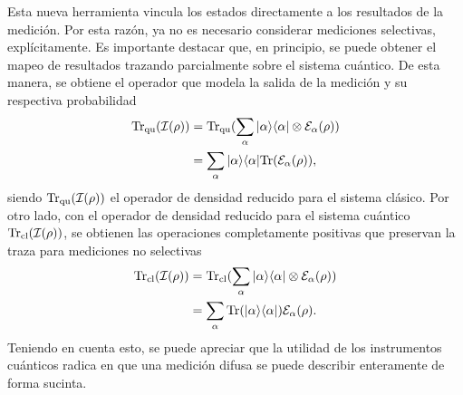 

Esta nueva herramienta vincula los estados directamente a los resultados de la
medición. Por esta razón, ya no es necesario considerar mediciones selectivas,
explícitamente.  Es importante destacar que, en principio, se puede obtener el
mapeo de resultados trazando parcialmente sobre el sistema cuántico. De
esta manera, se obtiene el operador que modela la salida de la medición y su
respectiva probabilidad 
\begin{equation}
    \begin{split}
    {\rm Tr}_{\text{qu}}(\mathcal{I}(\rho))&={\rm Tr}_{\text{qu}}(\sum_\alpha |\alpha\rangle \langle\alpha|\otimes \mathcal{E}_\alpha(\rho))\\
    &=\sum_\alpha |\alpha\rangle \langle\alpha|{\rm Tr}(\mathcal{E}_\alpha(\rho)),
\end{split}
\end{equation}siendo ${\rm Tr}_{\text{qu}}(\mathcal{I}(\rho))$ el operador de densidad reducido para el sistema clásico. 
Por otro lado, con el operador de densidad reducido para el sistema cuántico
${\rm Tr}_{\text{cl}}(\mathcal{I}(\rho))$, se obtienen las operaciones completamente
positivas que preservan la traza para mediciones no selectivas
\begin{equation}
    \begin{split}
        {\rm Tr}_{\text{cl}}(\mathcal{I}(\rho))&={\rm Tr}_{\text{cl}} (\sum_\alpha |\alpha\rangle \langle\alpha|\otimes \mathcal{E}_\alpha(\rho))\\
        &=\sum_\alpha {\rm Tr}(|\alpha\rangle \langle\alpha|)\mathcal{E}_\alpha(\rho).
    \end{split}
\end{equation} Teniendo en cuenta esto, se puede apreciar que la utilidad de los instrumentos cuánticos radica en que una medición difusa se puede describir enteramente de forma sucinta. 


